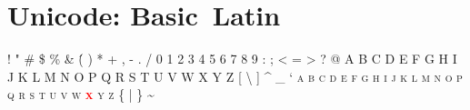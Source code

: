 

	\def\myred{red} %
	\def\checkno	{\textcolor{red}{\textbf{\ding{55}~~}}}
	\def\checkyes	{\textcolor{green}{\textbf{\LARGE\ding{51}~~}}}
	\def\checkmeh	{\textcolor{orange}{\textbf{\LARGE\textasciitilde~~}}}

\presection\section*{\quad Unicode: Basic~Latin\marginpar{\vspace{.25em}\checkmeh}}\postsection

\textsc{! " \# \$ \% \& \' ( ) * + , - . / 0 1 2 3 4 5 6 7 8 9 : ; < = > ? @ 
A B C D E F G H I J K L M N O P Q R S T U V W X Y Z [ \textbackslash{} ] \^{} \_ ` 
a b c d e f g h i j k l m n o p q r s t u v w \textcolor{\myred}{\textbf{x}} y z \{ | \} \textasciitilde}